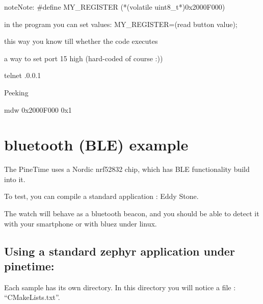 \documentclass[letterpaper,10pt,english]{sphinxmanual}
\begin{document}
\begin{sphinxadmonition}{note}{Note:}
\#define MY\_REGISTER (*(volatile uint8\_t*)0x2000F000)

in the program you can set values:
MY\_REGISTER=(read button value);

this way you know till whether the code executes
\end{sphinxadmonition}

a way to set port 15 high (hard-coded of course :))

\begin{sphinxVerbatim}[commandchars=\\\{\}]
\end{sphinxVerbatim}

\begin{sphinxVerbatim}[commandchars=\\\{\}]
telnet .0.0.1 
\end{sphinxVerbatim}

Peeking

\begin{sphinxVerbatim}[commandchars=\\\{\}]
\PYG{g+go}{Escape character is \PYGZsq{}\PYGZca{}]\PYGZsq{}.}
mdw 0x2000F000 0x1
\end{sphinxVerbatim}


\chapter{bluetooth (BLE) example}
\label{\detokenize{bluetooth:bluetooth-ble-example}}\label{\detokenize{bluetooth::doc}}
The PineTime uses a Nordic nrf52832 chip, which has BLE functionality build into it.

To test, you can compile a standard application : Eddy Stone.

The watch will behave as a bluetooth beacon, and you should be able to detect it with your smartphone or with bluez under linux.


\section{Using a standard zephyr application under pinetime:}
\label{\detokenize{bluetooth:using-a-standard-zephyr-application-under-pinetime}}
Each sample has its own directory.
In this directory you will notice a file : “CMakeLists.txt”.
\end{document}
